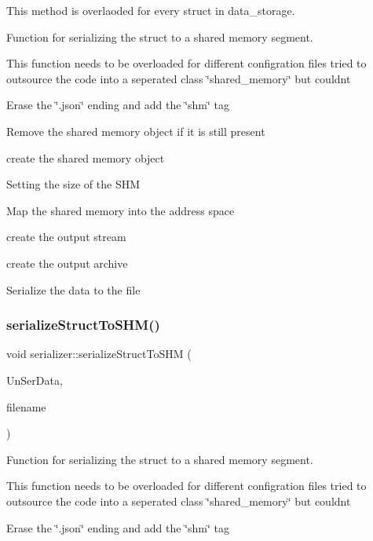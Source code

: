 This method is overlaoded for every struct in data\+\_\+storage. 

Function for serializing the struct to a shared memory segment.

This function needs to be overloaded for different configration files tried to outsource the code into a seperated class \char`\"{}shared\+\_\+memory\char`\"{} but couldnt

Erase the \char`\"{}.\+json\char`\"{} ending and add the \char`\"{}shm\char`\"{} tag

Remove the shared memory object if it is still present

create the shared memory object

Setting the size of the S\+HM

Map the shared memory into the address space

create the output stream

create the output archive

Serialize the data to the file \mbox{\label{classserializer_afb4c60973c4be742fb82cb23d43e8fac}} 
\subsubsection{\texorpdfstring{serialize\+Struct\+To\+S\+H\+M()}{serializeStructToSHM()}\hspace{0.1cm}{\footnotesize\ttfamily [2/2]}}
{\footnotesize\ttfamily void serializer\+::serialize\+Struct\+To\+S\+HM (\begin{DoxyParamCaption}\item[{\hyperlink{structEXMPLE__s}{E\+X\+M\+P\+L\+E\+\_\+s}}]{Un\+Ser\+Data,  }\item[{string}]{filename }\end{DoxyParamCaption})}



Function for serializing the struct to a shared memory segment. 

This function needs to be overloaded for different configration files tried to outsource the code into a seperated class \char`\"{}shared\+\_\+memory\char`\"{} but couldnt

Erase the \char`\"{}.\+json\char`\"{} ending and add the \char`\"{}shm\char`\"{} tag


